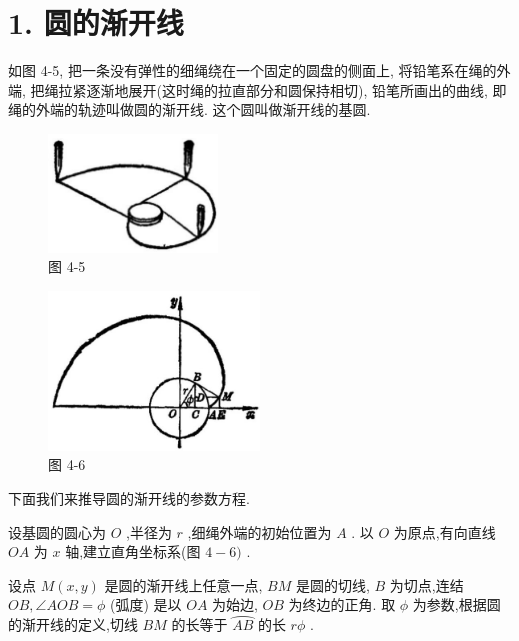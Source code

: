 \documentclass[lang=cn,newtx,10pt,scheme=chinese]{elegantbook}
\begin{document}
\section*{1. 圆的渐开线}

如图 4-5, 把一条没有弹性的细绳绕在一个固定的圆盘的侧面上, 将铅笔系在绳的外端, 把绳拉紧逐渐地展开(这时绳的拉直部分和圆保持相切), 铅笔所画出的曲线, 即绳的外端的轨迹叫做圆的渐开线. 这个圆叫做渐开线的基圆.

\begin{figure}[h]
  \centering
  \includegraphics[max width=0.4\textwidth]{images/01912cc2-ffb6-728e-9ae7-b113ff05c64b_167_188524.jpg}
  \caption{图 4-5}
\end{figure}



\begin{figure}[h]
  \centering
  \includegraphics[max width=0.5\textwidth]{images/01912cc2-ffb6-728e-9ae7-b113ff05c64b_167_197390.jpg}
  \caption{图 4-6}
\end{figure}



下面我们来推导圆的渐开线的参数方程.

设基圆的圆心为 \(O\) ,半径为 \(r\) ,细绳外端的初始位置为 \(A\) . 以 \(O\) 为原点,有向直线 \({OA}\) 为 \(x\) 轴,建立直角坐标系(图 \(4 - 6)\) .

设点 \(M\left( {x,y}\right)\) 是圆的渐开线上任意一点, \({BM}\) 是圆的切线, \(B\) 为切点,连结 \({OB},\angle {AOB} = \phi\) (弧度) 是以 \({OA}\) 为始边, \({OB}\) 为终边的正角. 取 \(\phi\) 为参数,根据圆的渐开线的定义,切线 \({BM}\) 的长等于 \(\overset{⏜}{AB}\) 的长 \({r\phi }\) .
\end{document}
